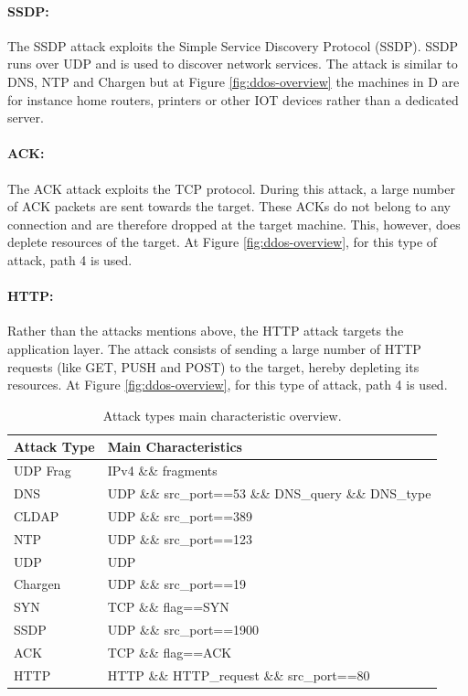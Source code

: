 \paragraph{SSDP:}
The SSDP attack exploits the Simple Service Discovery Protocol (SSDP). SSDP runs over UDP and is used to discover network services. The attack is similar to DNS, NTP and Chargen but at Figure \ref{fig:ddos-overview} the machines in D are for instance home routers, printers or other IOT devices rather than a dedicated server. 


\paragraph{ACK:}
The ACK attack exploits the TCP protocol. During this attack, a large number of ACK packets are sent towards the target. These ACKs do not belong to any connection and are therefore dropped at the target machine. This, however, does deplete resources of the target. At Figure \ref{fig:ddos-overview}, for this type of attack, path 4 is used.


\paragraph{HTTP:}
Rather than the attacks mentions above, the HTTP attack targets the application layer. The attack consists of sending a large number of HTTP requests (like GET, PUSH and POST) to the target, hereby depleting its resources. At Figure \ref{fig:ddos-overview}, for this type of attack, path 4 is used.



\begin{table}
\centering
\begin{tabular}{l | l}
Attack Type & Main Characteristics \\ \hline \hline
UDP Frag & IPv4 \&\& fragments \\ \hline
DNS & UDP \&\& src\_port==53 \&\& DNS\_query \&\& DNS\_type \\ \hline
CLDAP & UDP \&\& src\_port==389 \\ \hline
NTP & UDP \&\& src\_port==123 \\ \hline
UDP & UDP \\ \hline
Chargen & UDP \&\& src\_port==19 \\ \hline
SYN & TCP \&\& flag==SYN \\ \hline
SSDP & UDP \&\& src\_port==1900 \\ \hline
ACK & TCP \&\& flag==ACK \\ \hline
HTTP & HTTP \&\& HTTP\_request \&\& src\_port==80
\end{tabular}
\caption{\label{tab:attack-overview}Attack types main characteristic overview.}
\end{table}


